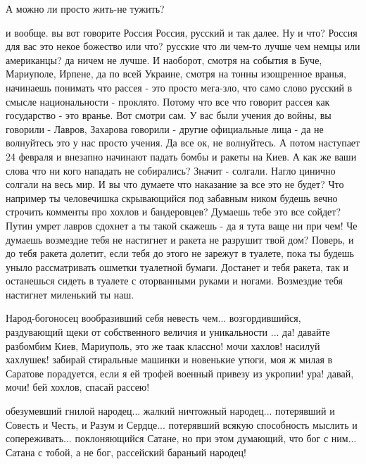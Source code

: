  
 
 
 
 

А можно ли просто жить-не тужить? 


и вообще. вы вот говорите Россия Россия, русский и так далее. Ну и что? Россия для вас это
некое божество или что? русские что ли чем-то лучше чем немцы или американцы? да ничем не лучше. 
И наоборот, смотря на события в Буче, Мариуполе, Ирпене, да по всей Украине, смотря на тонны изощренное вранья,
начинаешь понимать что рассея - это просто мега-зло, что само слово русский в смысле национальности - проклято.
Потому что все что говорит рассея как государство - это вранье. Вот смотри сам. У вас были учения до войны, вы говорили - Лавров, Захарова говорили - другие официальные лица - да не волнуйтесь это у нас просто учения. Да все ок, не волнуйтесь. А потом наступает 24 февраля и внезапно начинают падать бомбы и ракеты на Киев. А как же ваши слова что ни кого нападать не собирались?
Значит - солгали. Нагло цинично солгали на весь мир. И вы что думаете что наказание за все это не будет? Что например ты человечишка скрывающийся под забавным ником будешь вечно строчить комменты про хохлов и бандеровцев? Думаешь тебе это все сойдет?
Путин умрет лавров сдохнет а ты такой скажешь - да я тута ваще ни при чем! Че думаешь возмездие тебя не настигнет и ракета не 
разрушит твой дом? Поверь,  и до тебя ракета долетит, если тебя до этого не зарежут в туалете, пока ты будешь уныло рассматривать
ошметки туалетной бумаги. Достанет и тебя ракета, так и останешься сидеть в туалете с оторванными руками и ногами. Возмездие тебя настигнет миленький ты наш.

Народ-богоносец вообразивший себя невесть чем... возгордившийся, раздувающий щеки от собственного величия и уникальности ...
да! давайте разбомбим Киев, Мариуполь, это же таак классно! мочи хахлов! насилуй хахлушек! забирай стиральные машинки и
новенькие утюги, моя ж милая в Саратове порадуется, если я ей трофей военный привезу из укропии! ура! давай, мочи!
бей хохлов, спасай рассею! 

обезумевший гнилой народец... жалкий ничтожный народец... потерявший и Совесть и Честь, и Разум и Сердце... потерявший 
всякую способность мыслить и сопереживать... поклоняющийся Сатане, но при этом думающий, что бог с ним... Сатана с тобой,
а не бог, рассейский бараньий народец!
